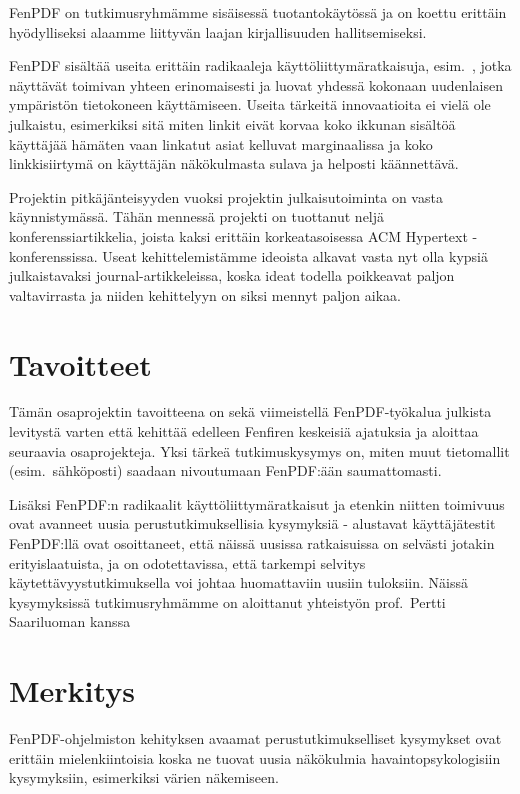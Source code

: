 \documentclass{article}
\begin{document}
FenPDF on tutkimusryhmämme
sisäisessä tuotantokäytössä ja on koettu erittäin hyödylliseksi 
alaamme liittyvän laajan kirjallisuuden hallitsemiseksi.

FenPDF sisältää useita erit\-täin radikaaleja käyttöliittymäratkaisuja,
esim.\ \cite{lukka02fillets,kujala03paper},
jotka näyttävät toimivan yhteen erin\-omaisesti ja luovat yhdessä
kokonaan uudenlaisen ym\-pä\-ris\-tön tietokoneen käyt\-tä\-mi\-seen.
Useita tärkeitä innovaatioita ei vielä ole julkaistu, esimerkiksi sitä 
miten linkit eivät korvaa koko ikkunan sisältöä käyttäjää hämäten vaan
linkatut asiat kelluvat marginaalissa ja koko linkkisiirtymä on käyttäjän
näkökulmasta sulava ja helposti käännettävä.

Projektin pitkä\-jän\-tei\-syy\-den
vuoksi
projektin julkaisutoiminta on vasta käyn\-nistymässä. 
Tähän mennessä projekti on tuottanut neljä konferenssiartikkelia,
joista kaksi erittäin korkeatasoisessa ACM Hypertext -konferenssissa.
Useat kehittelemistämme ideoista alkavat vasta nyt olla kypsiä julkaistavaksi
journal-artik\-keleissa, koska ideat todella poikkeavat paljon valtavirrasta
ja niiden kehittelyyn on siksi mennyt paljon aikaa.


\section{Tavoitteet}

Tämän osaprojektin tavoitteena on 
sekä viimeistellä FenPDF-työkalua julkista levitystä varten
että kehittää edelleen Fenfiren keskeisiä
ajatuksia ja aloittaa seuraavia osaprojekteja. Yksi tärkeä tutkimuskysymys
on, miten muut tietomallit (esim.\ sähköposti) saadaan nivoutumaan FenPDF:ään
saumattomasti.

Lisäksi FenPDF:n radikaalit käyttöliittymäratkaisut ja etenkin niitten toi\-mi\-vuus
ovat avanneet uusia perustutkimuksellisia kysymyksiä - alustavat 
käyttäjä\-testit FenPDF:llä ovat osoittaneet, että näissä uusissa 
ratkaisuissa on selvästi jotakin erityislaatuista, ja on odotettavissa, että tarkempi selvitys 
käytettävyys\-tut\-ki\-muk\-sel\-la voi johtaa huomattaviin uusiin tuloksiin.
Näissä kysymyksissä
tutkimusryhmämme on aloittanut yhteistyön prof.~Pertti Saariluoman kanssa


\section{Merkitys}

FenPDF-ohjelmiston kehityksen avaamat perustutkimukselliset kysymykset
ovat erit\-täin mielenkiintoisia koska ne tuovat uusia näkökulmia
havaintopsykologisiin kysymyksiin, esimerkiksi värien näkemiseen.
\end{document}
